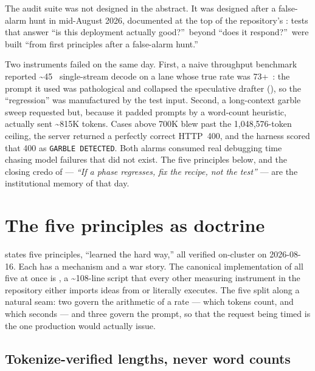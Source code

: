 The audit suite was not designed in the abstract. It was designed after a
false-alarm hunt in mid-August 2026, documented at the top of the repository's
: tests that answer ``is this deployment actually
good?''\ beyond ``does it respond?''\ were built ``from first principles
after a false-alarm hunt.''

\begin{hbwarstory}
Two instruments failed on the same day. First, a naive throughput benchmark
reported \textasciitilde{}45~\tokspersec{} single-stream decode on a lane whose
true rate was 73+~\tokspersec{}: the prompt it used was pathological and
collapsed the speculative drafter (), so the
``regression'' was manufactured by the test input. Second, a long-context
garble sweep requested  but, because it padded
prompts by a word-count heuristic, actually sent \textasciitilde{}815K
tokens. Cases above 700K blew past the 1{,}048{,}576-token ceiling, the
server returned a perfectly correct HTTP~400, and the harness scored that
400 as \texttt{GARBLE DETECTED}. Both alarms consumed real debugging time
chasing model failures that did not exist. The five principles below, and
the closing credo of  --- \emph{``If a phase
regresses, fix the recipe, not the test''} --- are the institutional memory
of that day.
\end{hbwarstory}

\section{The five principles as doctrine}

 states five principles, ``learned the hard way,''
all verified on-cluster on 2026-08-16. Each has a mechanism and a war story.
The canonical implementation of all five at once is
, a \textasciitilde{}108-line script that
every other measuring instrument in the repository either imports ideas from or
literally executes. The five split along a natural seam: two govern the
arithmetic of a rate --- which tokens count, and which seconds --- and three
govern the prompt, so that the request being timed is the one production
would actually issue.

\subsection{Tokenize-verified lengths, never word counts}

